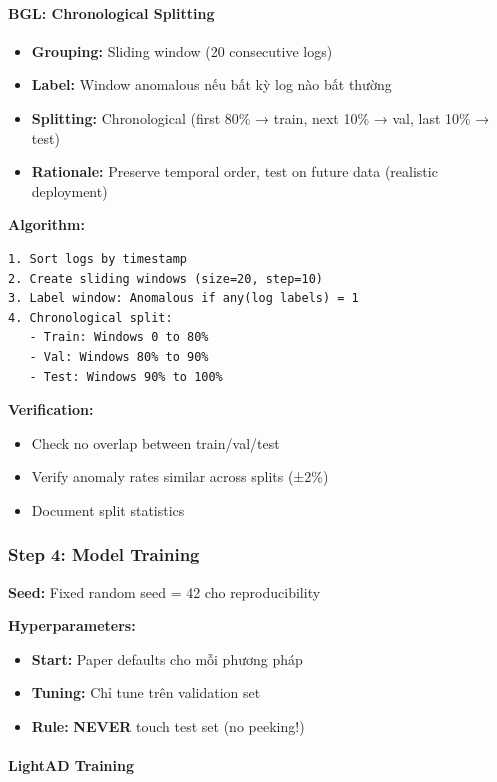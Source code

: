 \paragraph{BGL: Chronological Splitting}

\begin{itemize}
    \item \textbf{Grouping:} Sliding window (20 consecutive logs)
    \item \textbf{Label:} Window anomalous nếu bất kỳ log nào bất thường
    \item \textbf{Splitting:} Chronological (first 80\% → train, next 10\% → val, last 10\% → test)
    \item \textbf{Rationale:} Preserve temporal order, test on future data (realistic deployment)
\end{itemize}

\textbf{Algorithm:}
\begin{verbatim}
1. Sort logs by timestamp
2. Create sliding windows (size=20, step=10)
3. Label window: Anomalous if any(log labels) = 1
4. Chronological split:
   - Train: Windows 0 to 80%
   - Val: Windows 80% to 90%
   - Test: Windows 90% to 100%
\end{verbatim}

\textbf{Verification:}
\begin{itemize}
    \item Check no overlap between train/val/test
    \item Verify anomaly rates similar across splits (±2\%)
    \item Document split statistics
\end{itemize}

\subsubsection{Step 4: Model Training}

\textbf{Seed:} Fixed random seed = 42 cho reproducibility

\textbf{Hyperparameters:}
\begin{itemize}
    \item \textbf{Start:} Paper defaults cho mỗi phương pháp
    \item \textbf{Tuning:} Chỉ tune trên validation set
    \item \textbf{Rule:} \textbf{NEVER} touch test set (no peeking!)
\end{itemize}

\paragraph{LightAD Training}

